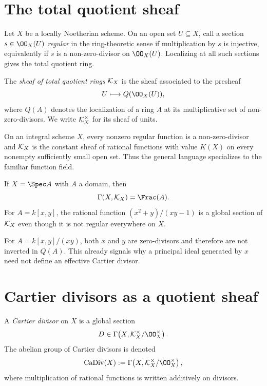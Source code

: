

\section{The total quotient sheaf}
Let \(X\) be a locally Noetherian scheme.  On an open set \(U\subseteq X\), call a section \(s\in\OO_X(U)\) \emph{regular} in the ring-theoretic sense if multiplication by \(s\) is injective, equivalently if \(s\) is a non-zero-divisor on \(\OO_X(U)\).  Localizing at all such sections gives the total quotient ring.

\begin{definition}\label{def:vi40-total-quotient}
The \emph{sheaf of total quotient rings} \(\mathcal{K}_X\) is the sheaf associated to the presheaf
\[
 U\longmapsto Q(\OO_X(U)),
\]
where \(Q(A)\) denotes the localization of a ring \(A\) at its multiplicative set of non-zero-divisors.  We write \(\mathcal{K}_X^\times\) for its sheaf of units.
\end{definition}

On an integral scheme \(X\), every nonzero regular function is a non-zero-divisor and \(\mathcal{K}_X\) is the constant sheaf of rational functions with value \(K(X)\) on every nonempty sufficiently small open set.  Thus the general language specializes to the familiar function field.

\begin{example}\label{ex:vi40-affine-total-quotient}
If \(X=\Spec A\) with \(A\) a domain, then
\[
 \Gamma(X,\KX)=\Frac(A).
\]
For \(A=k[x,y]\), the rational function \((x^2+y)/(xy-1)\) is a global section of \(\mathcal{K}_X\) even though it is not regular everywhere on \(X\).
\end{example}

\begin{example}\label{ex:vi40-reducible-total-quotient}
For \(A=k[x,y]/(xy)\), both \(x\) and \(y\) are zero-divisors and therefore are not inverted in \(Q(A)\).  This already signals why a principal ideal generated by \(x\) need not define an effective Cartier divisor.
\end{example}

\section{Cartier divisors as a quotient sheaf}
\begin{definition}\label{def:vi40-cartier}
A \emph{Cartier divisor} on \(X\) is a global section
\[
 D\in\Gamma\!\left(X,\KX^\times/\OO_X^\times\right).
\]
The abelian group of Cartier divisors is denoted
\[
 \CaDiv(X):=\Gamma\!\left(X,\KX^\times/\OO_X^\times\right),
\]
where multiplication of rational functions is written additively on divisors.
\end{definition}

